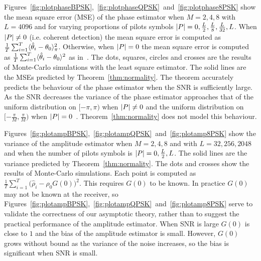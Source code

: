 \documentclass[journal]{IEEEtran}
\begin{document}
Figures~\ref{fig:plotphaseBPSK},~\ref{fig:plotphaseQPSK}~and~\ref{fig:plotphase8PSK} show the mean square error (MSE) of the phase estimator when $M=2,4,8$ with $L=4096$ and for varying proportions of pilots symbols ${\left\vert P \right\vert} = 0, \tfrac{L}{2}, \tfrac{L}{8}, \tfrac{L}{32}, L$.  When ${\left\vert P \right\vert} \neq 0$ (i.e. coherent detection) the mean square error is computed as $\tfrac{1}{T}\sum_{i=1}^T\langle \hat{\theta}_i - \theta_0 \rangle_\pi^2$.  Otherwise, when ${\left\vert P \right\vert}=0$ the mean square error is computed as $\tfrac{1}{T}\sum_{i=1}^T\langle \hat{\theta}_i - \theta_0 \rangle^2$ as in~\cite{McKilliam_leastsqPSKnoncoICASSP_2012}.  The dots, squares, circles and crosses are the results of Monte-Carlo simulations with the least square estimator.  The solid lines are the MSEs predicted by Theorem~\ref{thm:normality}.  The theorem accurately predicts the behaviour of the phase estimator when the SNR is sufficiently large.  As the SNR decreases the variance of the phase estimator approaches that of the uniform distribution on $[-\pi, \pi)$ when ${\left\vert P \right\vert} \neq 0$ and the uniform distribution on $[-\tfrac{\pi}{M}, \tfrac{\pi}{M})$ when ${\left\vert P \right\vert}=0$~\cite{McKilliam_leastsqPSKnoncoICASSP_2012}.  Theorem~\ref{thm:normality} does not model this behaviour.

Figures~\ref{fig:plotampBPSK},~\ref{fig:plotampQPSK}~and~\ref{fig:plotamp8PSK} show the variance of the amplitude estimator when $M=2,4,8$ and with $L=32, 256, 2048$ and when the number of pilots symbols is ${\left\vert P \right\vert} = 0, \tfrac{L}{2}, L$.  The solid lines are the variance predicted by Theorem~\ref{thm:normality}.  The dots and crosses show the results of Monte-Carlo simulations.  Each point is computed as $\tfrac{1}{T}\sum_{i=1}^T\big(\hat{\rho}_i - \rho_0G(0)\big)^2$.  This requires $G(0)$ to be known.  In practice $G(0)$ may not be known at the receiver, so Figures~\ref{fig:plotampBPSK},~\ref{fig:plotampQPSK}~and~\ref{fig:plotamp8PSK} serve to validate the correctness of our asymptotic theory, rather than to suggest the practical performance of the amplitude estimator.  When SNR is large $G(0)$ is close to $1$ and the bias of the amplitude estimator is small.  However, $G(0)$ grows without bound as the variance of the noise increases, so the bias is significant when SNR is small.
\end{document}
